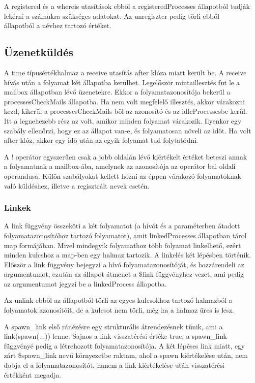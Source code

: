 \documentclass[]{article}
\begin{document}
A registered és a whereis utasítások ebből a registeredProcesses állapotból tudják lekérni a számukra szükséges adatokat. Az unregiszter pedig törli ebből állapotból a névhez tartozó értéket.

\subsection*{Üzenetküldés}
A time típusértékhalmaz a receive utasítás after klóza miatt került be. A receive hívás után a folyamat két állapotba kerülhet. Legelőször mintaillesztés fut le a mailbox állapotban lévő üzenetekre. Ekkor a folyamatazonosítója bekerül a processesCheckMails állapotba. Ha nem volt megfelelő illesztés, akkor várakozni kezd, kikerül a processesCheckMails-ből az azonosító és az idleProcessesbe kerül. Itt a legnehezebb rész az volt, amikor minden folyamat várakozik. Ilyenkor egy szabály ellenőrzi, hogy ez az állapot van-e, és folyamatosan növeli az időt. Ha volt after klóz, akkor egy idő után az egyik folyamat tud folytatódni.

A ! operátor egyszerűen csak a jobb oldalán lévő kiértékelt értéket beteszi annak a folyamatnak a mailbox-ába, amelynek az azonosítója az operátor bal oldali operandusa. Külön szabályokat kellett hozni az éppen várakozó folyamatoknak való küldéshez, illetve a regisztrált nevek esetén.

\subsubsection*{Linkek}
A link függvény összeköti a két folyamatot (a hívót és a paraméterben átadott folyamatazonosítóhoz tartozó folyamatot), amit linkedProcesses állapotban tárol map formájában. Mivel mindegyik folyamathoz több folyamat linkelhető, ezért minden kulcshoz a map-ben egy halmaz tartozik. A linkelés két lépésben történik. Először a link függvény bejegyzi a hívó folyamatazonosítóját, és hozzárendeli az argumentumot, ezután az állapot átmenet a \$link függvényhez vezet, ami pedig az argumentumot jegyzi be a linkedProcess állapotba.

Az unlink ebből az állapotból törli az egyes kulcsokhoz tartozó halmazból a folyamatok azonosítóit, de a kulcsot nem törli, még ha a halmaz üres is lesz.

A spawn\_link első ránézésre egy strukturális átrendezésnek tűnik, ami a link(spawn(...)) lenne. Sajnos a link visszatérési értéke true, a spawn\_link függvényé pedig a létrehozott folyamatazonosítója. A két lépéses link miatt, egy zárt \$spawn\_link nevű környezetbe raktam, ahol a spawn kiértékelése után, nem dobja el a folyamatazonosítót, hanem a link kiértékelése után visszatérési értékként megadja.
\end{document}
